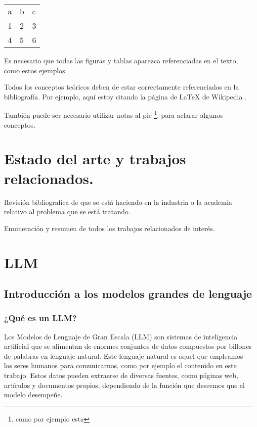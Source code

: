 \begin{table}[]
\begin{tabular}{lll}
a & b & c \\
1 & 2 & 3 \\
4 & 5 & 6
\end{tabular}
\caption{}
\label{tab:my-table}
\end{table}

Es necesario que todas las figuras y tablas aparezca referenciadas en el texto, como estos ejemplos.

Todos los conceptos teóricos deben de estar correctamente referenciados en la bibliografía. Por ejemplo, aquí estoy citando la página de \LaTeX{} de Wikipedia \cite{wiki:latex}.

También puede ser necesario utilizar notas al pie \footnote{como por ejemplo esta}, para aclarar algunos conceptos.


\section{Estado del arte y trabajos relacionados.}

Revisión bibliografica de que se está haciendo en la industria o la academia relativo al problema que se está tratando.

Enumeración y resumen de todos los trabajos relacionados de interés.

\section{LLM}
\subsection{Introducción a los modelos grandes de lenguaje}
\subsubsection{¿Qué es un LLM?}

Los Modelos de Lenguaje de Gran Escala (LLM) son sistemas de inteligencia artificial que se alimentan de enormes conjuntos de datos compuestos por billones de palabras en lenguaje natural. Este lenguaje natural es aquel que empleamos los seres humanos para comunicarnos, como por ejemplo el contenido en este trabajo. Estos datos pueden extraerse de diversas fuentes, como páginas web, artículos y documentos propios, dependiendo de la función que deseemos que el modelo desempeñe.

